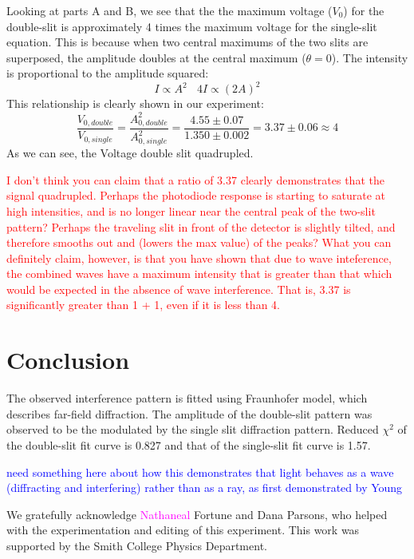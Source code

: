 \documentclass[prb,preprint]{revtex4-1}
\begin{document}
Looking at parts A and B, we see that the the maximum voltage ($V_0$) for the double-slit is approximately 4 times the maximum voltage for the single-slit equation. This is because when two central maximums of the two slits are superposed, the amplitude doubles at the central maximum ($\theta = 0$). The intensity is proportional to the amplitude squared: $$I \propto A^2 \ \ \ \	4I \propto(2A)^2$$ This relationship is clearly shown in our experiment: $$\frac{V_{0,double}}{V_{0,single}}=\frac{A_{0,double}^2}{A_{0,single}^2} = \frac{4.55\pm 0.07}{1.350 \pm 0.002}=3.37 \pm 0.06 \approx4$$ As we can see, the Voltage  double slit quadrupled.

\textcolor{red}{I don't think you can claim that a ratio of 3.37 clearly demonstrates that the signal quadrupled.  Perhaps the photodiode response is starting to saturate at high intensities, and is no longer linear near the central peak of the two-slit pattern? Perhaps the traveling slit in front of the detector is slightly tilted, and therefore smooths out and (lowers the max value) of the peaks? What you can definitely claim, however, is that you have shown that due to wave inteference, the combined waves have a maximum intensity that is greater than that which would be expected in the absence of wave interference. That is, 3.37 is significantly greater than 1 + 1, even if it is less than 4. } 




\section{Conclusion}

 The observed interference pattern is fitted using Fraunhofer model, which describes far-field diffraction. The amplitude of the double-slit pattern was observed to be the modulated by the single slit diffraction pattern. Reduced $\chi^2$ of the double-slit fit curve is 0.827 and that of the single-slit fit curve is 1.57.

\textcolor{blue}{need something here about how this demonstrates that light behaves as a wave (diffracting and interfering) rather than as a ray, as first demonstrated by Young} 


\begin{acknowledgments}

We gratefully acknowledge \textcolor{magenta}{Nathaneal} Fortune and Dana Parsons, who helped with the experimentation and editing of this experiment.  This work was supported by the Smith College Physics Department.

\end{acknowledgments}
\end{document}
